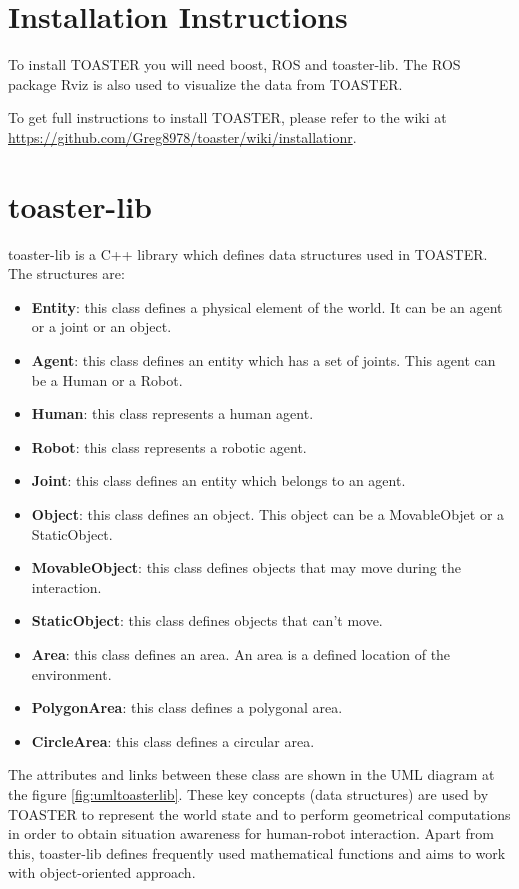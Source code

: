 \documentclass[a4paper]{article}
\begin{document}
\section{Installation Instructions}
To install TOASTER you will need boost, ROS and toaster-lib. The ROS package Rviz is also used to visualize the data from TOASTER.

To get full instructions to install TOASTER, please refer to the wiki at
\url{https://github.com/Greg8978/toaster/wiki/installationr}.

\section{toaster-lib}
toaster-lib is a C++ library which defines data structures used in TOASTER. The structures are:
\begin{itemize}
\item \textbf{Entity}: this class defines a physical element of the world. It can be an agent or a joint or an object.
\item \textbf{Agent}: this class defines an entity which has a set of joints. This agent can be a Human or a Robot.
\item \textbf{Human}: this class represents a human agent.
\item \textbf{Robot}: this class represents a robotic agent.
\item \textbf{Joint}: this class defines an entity which belongs to an agent.
\item \textbf{Object}: this class defines an object. This object can be a MovableObjet or a StaticObject.
\item \textbf{MovableObject}: this class defines objects that may move during the interaction.
\item \textbf{StaticObject}: this class defines objects that can't move.
\item \textbf{Area}: this class defines an area. An area is a defined location of the environment.
\item \textbf{PolygonArea}: this class defines a polygonal area.
\item \textbf{CircleArea}: this class defines a circular area.
\end{itemize}

The attributes and links between these class are shown in the UML diagram at the figure \ref{fig:umltoasterlib}.
These key concepts (data structures) are used by TOASTER to represent the world state and to perform geometrical computations in order to obtain situation awareness for human-robot interaction. Apart from this, toaster-lib defines frequently used mathematical functions and aims to work with object-oriented approach.
\end{document}

